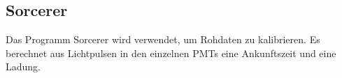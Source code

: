 \subsection{Sorcerer}%
\label{sub:sorcerer}

Das Programm Sorcerer wird verwendet, um Rohdaten zu kalibrieren.
Es berechnet aus Lichtpulsen in den einzelnen PMTs eine Ankunftszeit und eine
Ladung.
